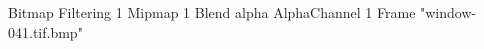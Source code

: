{Bitmap
	{Filtering 1}
	{Mipmap 1}
	{Blend alpha}
	{AlphaChannel 1}
	{Frame "window-041.tif.bmp"}
}
